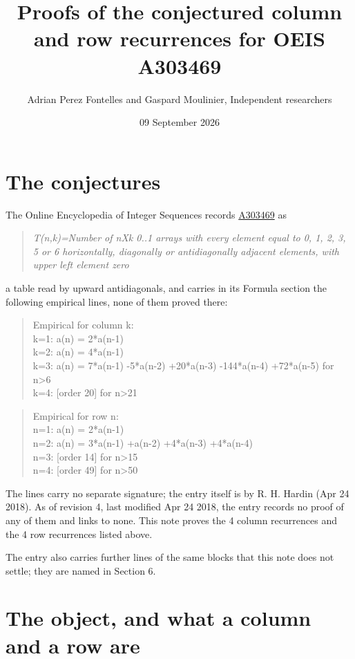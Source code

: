 \documentclass[11pt]{article}
\title{Proofs of the conjectured column and row recurrences for OEIS A303469}
\author{Adrian Perez Fontelles and Gaspard Moulinier, Independent researchers}
\date{09 September 2026}
\theoremstyle{definition}
\begin{document}
\maketitle
\section{The conjectures}

The Online Encyclopedia of Integer Sequences records \href{https://oeis.org/A303469}{A303469} as

\begin{quote}\itshape T(n,k)=Number of nXk 0..1 arrays with every element equal to 0, 1, 2, 3, 5 or 6 horizontally, diagonally or antidiagonally adjacent elements, with upper left element zero\end{quote}

a table read by upward antidiagonals, and carries in its Formula section the following empirical lines, none of them proved there:

\begin{quote}\ttfamily Empirical for column k:\\
k=1: a(n) = 2*a(n-1)\\k=2: a(n) = 4*a(n-1)\\k=3: a(n) = 7*a(n-1) -5*a(n-2) +20*a(n-3) -144*a(n-4) +72*a(n-5) for n>6\\k=4: [order 20] for n>21\end{quote}

\begin{quote}\ttfamily Empirical for row n:\\
n=1: a(n) = 2*a(n-1)\\n=2: a(n) = 3*a(n-1) +a(n-2) +4*a(n-3) +4*a(n-4)\\n=3: [order 14] for n>15\\n=4: [order 49] for n>50\end{quote}

The lines carry no separate signature; the entry itself is by R. H. Hardin (Apr 24 2018). As of revision 4, last modified Apr 24 2018, the entry records no proof of any of them and links to none. This note proves the 4 column recurrences and the 4 row recurrences listed above.

The entry also carries further lines of the same blocks that this note does not settle; they are named in Section 6.

\section{The object, and what a column and a row are}
\end{document}
